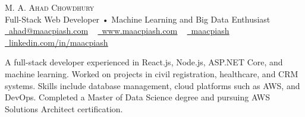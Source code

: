 \documentclass[12pt,a4paper]{article}
\newcommand{\resumeSubHeadingListStart}{\begin{itemize}[leftmargin=0.0in, label={}]\itemsep0.75em}
\newcommand{\resumeSubHeadingListEnd}{\end{itemize}}
\begin{document}
\begin{center}
  {\Huge \scshape M. A. Ahad Chowdhury} \\ \vspace{5pt}
  Full-Stack Web Developer • Machine Learning and Big Data Enthusiast \\ \vspace{5pt}
  \small \href{mailto:ahad@maacpiash.com}{\raisebox{-0.2\height}\faEnvelope\  \underline{ahad@maacpiash.com}} ~ \href{https://www.maacpiash.com}{\raisebox{-0.2\height}\faGlobe\ \underline{www.maacpiash.com}} ~ \href{https://github.com/maacpiash}{\raisebox{-0.2\height}\faGithub\ \underline{maacpiash}} ~
  \href{https://linkedin.com/in/maacpiash}{\raisebox{-0.2\height}\faLinkedin\ \underline{linkedin.com/in/maacpiash}}
  \vspace{5pt}
\end{center}



\begin{justify}
  A full-stack developer experienced in React.js, Node.js, ASP.NET Core, and machine learning. Worked on projects in civil registration, healthcare, and CRM systems. Skills include database management, cloud platforms such as AWS, and DevOps. Completed a Master of Data Science degree and pursuing AWS Solutions Architect certification.
\end{justify}
\end{document}
